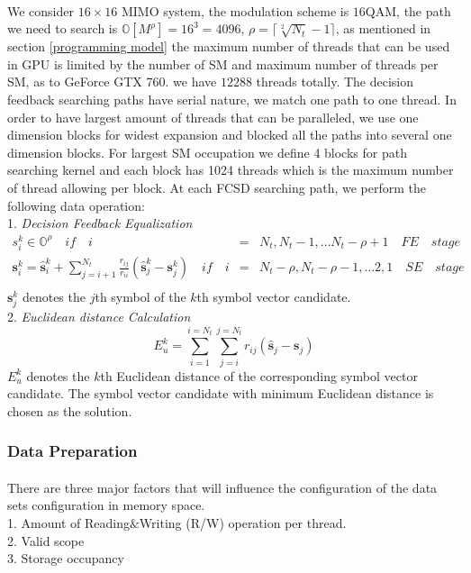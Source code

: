 \documentclass[12pt,a4paper,final]{article}
\begin{document}
\begin{spacing}{2.5}
  \paragraph{}We consider $16\times 16$ MIMO system, the modulation scheme is $16$QAM, the path we need to search is $\mathbb{O}[M^{\rho}]=16^{3}=4096$, $\rho=\lceil \sqrt[2]{N_{t}}-1\rceil$, as mentioned in section \ref{programming model} the maximum number of threads that can be used in GPU is limited by the number of SM and maximum number of threads per SM, as to GeForce GTX 760. we have $12288$ threads totally. The decision feedback searching paths have serial nature, we match one path to one thread. In order to have largest amount of threads that can be paralleled, we use one dimension blocks for widest expansion and blocked all the paths into several one dimension blocks. For largest SM occupation we define 4 blocks for path searching kernel and each block has 1024 threads which is the maximum number of thread allowing per block. At each FCSD searching path, we perform the following data operation:\\
1. \emph{Decision Feedback Equalization}\\
\begin{eqnarray}
\nonumber
{s}_{i}^{k}\in \mathbb{O}^{\rho}      \quad if\quad i&=&N_{t},N_{t}-1,\dots N_{t}-\rho+1\quad FE \quad stage\\
\nonumber
\mathbf{s}_{i}^{k}=\mathbf{\hat{s}}_{i}^{k}+\sum_{j=i+1}^{N_{t}}\frac{r_{ij}}{r_{ii}}(\mathbf{\hat{s}}_{j}^{k}-\mathbf{s}_{j}^{k})\quad if\quad i &=& N_{t}-\rho,N_{t}-\rho-1,\dots 2,1\quad SE\quad stage\\  \label{path searching}
\end{eqnarray}
$\mathbf{s}_{j}^{k}$ denotes the $j$th symbol of the $k$th symbol vector candidate.\\
2. \emph{Euclidean distance Calculation}\\
\begin{equation}
E_{u}^{k}=\sum_{i=1}^{i=N_{t}}\sum_{j=i}^{j=N_{t}}r_{ij}(\mathbf{\hat{s}}_{j}-\mathbf{s}_{j})\label{Eu metric}
\end{equation}
$E_{u}^{k}$ denotes the $k$th Euclidean distance of the corresponding symbol vector candidate. The symbol vector candidate with minimum Euclidean distance is chosen as the solution.  
\subsubsection{Data Preparation}
\paragraph{}There are three major factors that will influence the configuration of the data sets configuration in memory space.\\
1. Amount of Reading$\&$Writing (R/W) operation per thread.\\
2. Valid scope\\
3. Storage occupancy\\

\end{spacing}
\end{document}
